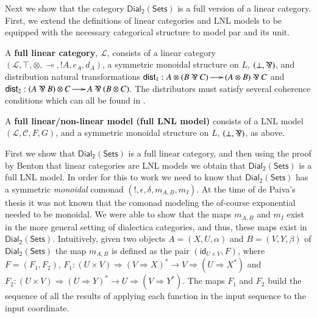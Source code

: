 \documentclass{elsarticle}
\newcommand{\cat}[1]{\mathcal{#1}}
\newcommand{\limp}[0]{\multimap}
\newcommand{\dial}[0]{\mathsf{Dial_2}(\mathsf{Sets})}
\newcommand{\id}[0]{\mathsf{id}}
\begin{document}
Next we show that the category $\dial$ is a full version of a linear
category. First, we extend the definitions of linear categories and
LNL models to be equipped with the necessary categorical structure to
model par and its unit.
\begin{definition}
  \label{def:full-linear-cat}
  A \textbf{full linear category}, $\mathcal{L}$, consists of a linear
  category \\$(\mathcal{L}, \top, \otimes, \limp,!A,e_A,d_A)$, a
  symmetric monoidal structure on $L$, $(\perp, \parr)$, and
  distribution natural transformations $\mathsf{dist}_1 : A \otimes (B
  \parr C) \to (A \otimes B) \parr C$ and $\mathsf{dist}_2 : (A \parr
  B) \otimes C \to A \parr (B \otimes C)$.  The distributors must
  satisfy several coherence conditions which can all be found in
  \cite{Cockett:1997}.
\end{definition}
\begin{definition}
  \label{def:full-lnl-model}
  A \textbf{full linear/non-linear model (full LNL model)} consists of
  a LNL model $(\cat{L}, \cat{C},F,G)$, and a symmetric monoidal
  structure on $L$, $(\perp, \parr)$, as above.
\end{definition}

\noindent
First we show that $\dial$ is a full linear category, and then using
the proof by Benton that linear categories are LNL models we obtain
that $\dial$ is a full LNL model. In order for this to work we
need to know that $\dial$ has a symmetric \textit{monoidal} comonad $(!,
\epsilon, \delta, m_{A,B}, m_I)$.  At the time of de Paiva's
thesis it was not known that the comonad modeling the of-course
exponential needed to be monoidal.  We were able to show that the maps
$m_{A,B}$ and $m_I$ exist in the more general setting of dialectica
categories, and thus, these maps exist in $\dial$. Intuitively, given
two objects $A = (X,U,\alpha)$ and $B = (V,Y,\beta)$ of $\dial$ the
map $m_{A,B}$ is defined as the pair $(\id_{U \times V},F)$, where $F
= (F_1,F_2)$, $F_1 : (U \times V) \Rightarrow (V \Rightarrow X)^* \to
V \Rightarrow (U \Rightarrow X^*)$ and $F_2 : (U \times V) \Rightarrow
(U \Rightarrow Y)^* \to U \Rightarrow (V \Rightarrow Y^*)$.  The maps
$F_1$ and $F_2$ build the sequence of all the results of applying each
function in the input sequence to the input coordinate.
\end{document}

